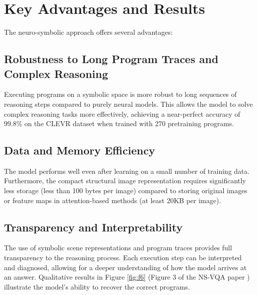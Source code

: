 \documentclass[10pt, oneside]{article}
\begin{document}
\section{Key Advantages and Results}
The neuro-symbolic approach offers several advantages:

\subsection{Robustness to Long Program Traces and Complex Reasoning}
Executing programs on a symbolic space is more robust to long sequences of reasoning steps compared to purely neural models. This allows the model to solve complex reasoning tasks more effectively, achieving a near-perfect accuracy of 99.8\% on the CLEVR dataset when trained with 270 pretraining programs.

\subsection{Data and Memory Efficiency}
The model performs well even after learning on a small number of training data. Furthermore, the compact structural image representation requires significantly less storage (less than 100 bytes per image) compared to storing original images or feature maps in attention-based methods (at least 20KB per image).

\subsection{Transparency and Interpretability}
The use of symbolic scene representations and program traces provides full transparency to the reasoning process. Each execution step can be interpreted and diagnosed, allowing for a deeper understanding of how the model arrives at an answer. Qualitative results in Figure \ref{fig:f6} (Figure 3 of the NS-VQA paper \cite{Yi2018}) illustrate the model's ability to recover the correct programs.
\end{document}
